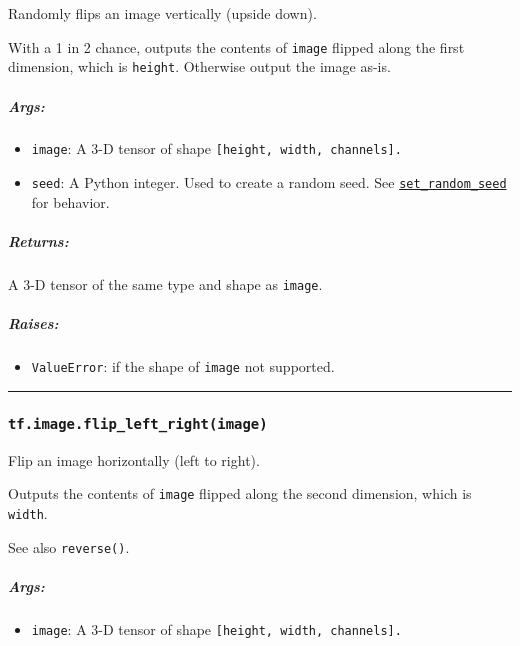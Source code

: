 Randomly flips an image vertically (upside down).

With a 1 in 2 chance, outputs the contents of \texttt{image} flipped
along the first dimension, which is \texttt{height}. Otherwise output
the image as-is.

\subparagraph{Args: }\label{args-15}

\begin{itemize}
\tightlist
\item
  \texttt{image}: A 3-D tensor of shape
  \texttt{{[}height,\ width,\ channels{]}.}
\item
  \texttt{seed}: A Python integer. Used to create a random seed. See
  \href{../../api_docs/python/constant_op.md\#set_random_seed}{\texttt{set\_random\_seed}}
  for behavior.
\end{itemize}

\subparagraph{Returns: }\label{returns-15}

A 3-D tensor of the same type and shape as \texttt{image}.

\subparagraph{Raises: }\label{raises-5}

\begin{itemize}
\tightlist
\item
  \texttt{ValueError}: if the shape of \texttt{image} not supported.
\end{itemize}

\begin{center}\rule{0.5\linewidth}{\linethickness}\end{center}

\subsubsection{\texorpdfstring{\texttt{tf.image.flip\_left\_right(image)}
}{tf.image.flip\_left\_right(image) }}\label{tf.image.flipux5fleftux5frightimage}

Flip an image horizontally (left to right).

Outputs the contents of \texttt{image} flipped along the second
dimension, which is \texttt{width}.

See also \texttt{reverse()}.

\subparagraph{Args: }\label{args-16}

\begin{itemize}
\tightlist
\item
  \texttt{image}: A 3-D tensor of shape
  \texttt{{[}height,\ width,\ channels{]}.}
\end{itemize}

